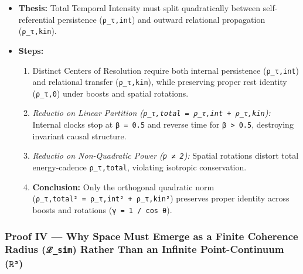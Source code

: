 \documentclass[
]{article}
\begin{document}
\begin{itemize}
\item
  \textbf{Thesis:} Total Temporal Intensity must split quadratically
  between self-referential persistence (\texttt{ρ\_τ,int}) and outward
  relational propagation (\texttt{ρ\_τ,kin}).
\item
  \textbf{Steps:}

  \begin{enumerate}
  \def\labelenumi{\arabic{enumi}.}
  \item
    Distinct Centers of Resolution require both internal persistence
    (\texttt{ρ\_τ,int}) and relational transfer (\texttt{ρ\_τ,kin}),
    while preserving proper rest identity (\texttt{ρ\_τ,0}) under boosts
    and spatial rotations.
  \item
    \emph{Reductio on Linear Partition
    (\texttt{ρ\_τ,total~=~ρ\_τ,int~+~ρ\_τ,kin}):} Internal clocks stop
    at \texttt{β~=~0.5} and reverse time for
    \texttt{β~\textgreater{}~0.5}, destroying invariant causal
    structure.
  \item
    \emph{Reductio on Non-Quadratic Power (\texttt{p~≠~2}):} Spatial
    rotations distort total energy-cadence \texttt{ρ\_τ,total},
    violating isotropic conservation.
  \item
    \textbf{Conclusion:} Only the orthogonal quadratic norm
    (\texttt{ρ\_τ,total²~=~ρ\_τ,int²~+~ρ\_τ,kin²}) preserves proper
    identity across boosts and rotations (\texttt{γ~=~1~/~cos~θ}).
  \end{enumerate}
\end{itemize}

\subsubsection{\texorpdfstring{Proof IV --- Why Space Must Emerge as a
Finite Coherence Radius (\texttt{ℒ\_sim}) Rather Than an Infinite
Point-Continuum
(\texttt{ℝ³})}{Proof IV --- Why Space Must Emerge as a Finite Coherence Radius (ℒ\_sim) Rather Than an Infinite Point-Continuum (ℝ³)}}\label{proof-iv-why-space-must-emerge-as-a-finite-coherence-radius-ux2112_sim-rather-than-an-infinite-point-continuum-ux211duxb3}
\end{document}
